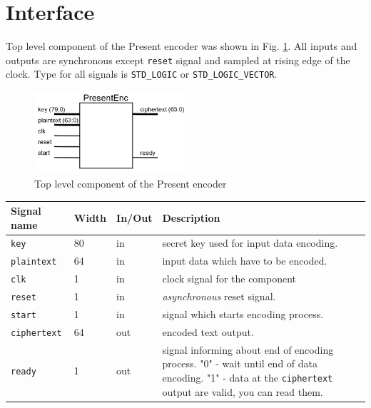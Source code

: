\documentclass{gajewski}
\begin{document}
\newpage 

\section{Interface}

Top level component of the Present encoder was shown in Fig. \ref{penc}. All inputs and outputs are synchronous except \texttt{reset} signal and sampled at rising edge of the clock. Type for all signals is \texttt{STD\_LOGIC} or \texttt{STD\_LOGIC\_VECTOR}.
\begin{figure}[!ht]%
    \begin{center}
    \includegraphics[width=0.5\textwidth]{img/PresentEnc.png}
    \caption{%
        Top level component of the Present encoder
     }%
    \label{penc}
    \end{center}
 \end{figure}

\begin{tabularx}{\textwidth}{|p{30mm}|p{11mm}|p{11mm}|X|}
  \hline \bf{Signal name} & \bf{Width} & \bf{In/Out} & \bf{Description}\\ 
  \hline \texttt{key}	& 80  &  in  & secret key used for input data encoding. \\ 
  \hline \texttt{plaintext}	& 64  &  in  & input data which have to be encoded. \\ 
  \hline \texttt{clk}	& 1  &  in  &  clock signal for the component\\ 
  \hline \texttt{reset} & 1   &  in  & \emph{asynchronous} reset signal.	\\ 
  \hline \texttt{start} & 1   &  in  & signal which starts encoding process. \\ 
  \hline \texttt{ciphertext} & 64   &  out  & encoded text output. \\ 
  \hline \texttt{ready} & 1   &  out  & signal informing about end of encoding process. \newline  "0" - wait until end of data encoding. \newline  "1" - data at the \texttt{ciphertext} output are valid, you can read them. \\ 
  \hline
\end{tabularx}
\end{document}
